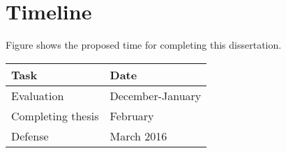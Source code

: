 \section{Timeline}

Figure shows the proposed time for completing this dissertation.
\begin{center}
\begin{tabular}{| l | l |}
	\hline
	Task & Date \\ \hline
	Evaluation & December-January \\
	\hline
	Completing thesis & February \\
	\hline
	Defense & March 2016 \\
	\hline
	
\end{tabular}
\end{center}


